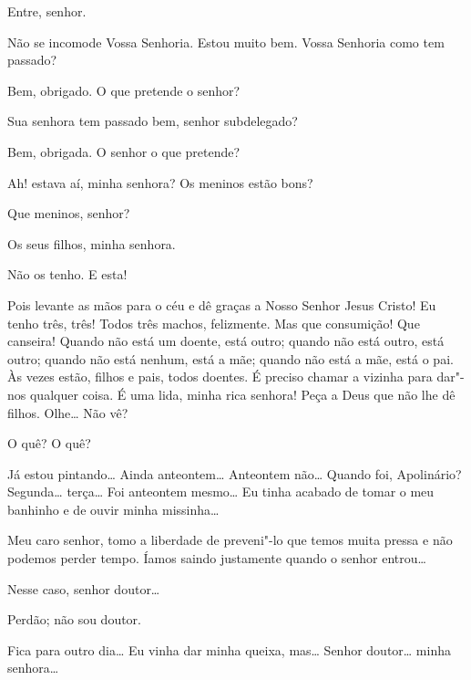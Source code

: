  Entre, senhor. 

  Não se incomode
Vossa Senhoria. Estou muito bem. Vossa Senhoria como tem passado?

 Bem, obrigado. O que pretende o senhor?

 Sua senhora tem passado bem, senhor subdelegado?

 Bem, obrigada. O senhor o que pretende?

 Ah! estava aí, minha senhora? Os meninos estão bons?

 Que meninos, senhor?

 Os seus filhos, minha senhora.

 Não os tenho. E esta!

 Pois levante as mãos para o céu e dê graças a Nosso Senhor Jesus
Cristo!  Eu tenho três, três!
Todos três machos, felizmente. Mas que consumição! Que canseira! Quando não está
um doente, está outro; quando não está outro, está outro; quando não está
nenhum, está a mãe; quando não está a mãe, está o pai. Às vezes estão, filhos e
pais, todos doentes. É preciso chamar a
vizinha para dar"-nos qualquer coisa. É uma lida, minha rica senhora!
Peça a Deus que não lhe dê filhos. Olhe\ldots{}  Não vê?

 O quê? O quê?

 Já estou pintando\ldots{} Ainda anteontem\ldots{} Anteontem
não\ldots{} Quando foi, Apolinário? Segunda\ldots{} terça\ldots{} Foi anteontem
mesmo\ldots{}  Eu tinha acabado de tomar o meu banhinho e de ouvir minha
missinha\ldots{}

   Meu caro senhor, tomo a liberdade
de preveni"-lo que temos muita pressa e não
podemos perder tempo. Íamos saindo justamente quando o senhor entrou\ldots{}

  Nesse caso, senhor doutor\ldots{}

 Perdão; não sou doutor.

 Fica para outro dia\ldots{} Eu vinha dar minha queixa, mas\ldots{}
 Senhor doutor\ldots{} minha
senhora\ldots{} 

